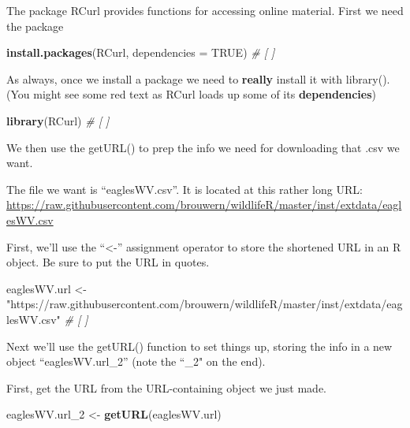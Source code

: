 \documentclass[]{book}
\newenvironment{Shaded}{\begin{snugshade}}{\end{snugshade}}
\newcommand{\KeywordTok}[1]{\textcolor[rgb]{0.13,0.29,0.53}{\textbf{#1}}}
\newcommand{\DataTypeTok}[1]{\textcolor[rgb]{0.13,0.29,0.53}{#1}}
\newcommand{\DecValTok}[1]{\textcolor[rgb]{0.00,0.00,0.81}{#1}}
\newcommand{\StringTok}[1]{\textcolor[rgb]{0.31,0.60,0.02}{#1}}
\newcommand{\CommentTok}[1]{\textcolor[rgb]{0.56,0.35,0.01}{\textit{#1}}}
\newcommand{\OtherTok}[1]{\textcolor[rgb]{0.56,0.35,0.01}{#1}}
\newcommand{\NormalTok}[1]{#1}
\theoremstyle{definition}
\theoremstyle{definition}
\theoremstyle{definition}
\theoremstyle{remark}
\begin{document}
The package RCurl provides functions for accessing online material.
First we need the package

\begin{Shaded}
\begin{Highlighting}[]
\KeywordTok{install.packages}\NormalTok{(RCurl, }\DataTypeTok{dependencies =} \OtherTok{TRUE}\NormalTok{) }\CommentTok{# [ ]}
\end{Highlighting}
\end{Shaded}

As always, once we install a package we need to \textbf{really} install
it with library(). (You might see some red text as RCurl loads up some
of its \textbf{dependencies})

\begin{Shaded}
\begin{Highlighting}[]
\KeywordTok{library}\NormalTok{(RCurl) }\CommentTok{# [ ]}
\end{Highlighting}
\end{Shaded}

We then use the getURL() to prep the info we need for downloading that
.csv we want.

The file we want is ``eaglesWV.csv''. It is located at this rather long
URL:\\
\url{https://raw.githubusercontent.com/brouwern/wildlifeR/master/inst/extdata/eaglesWV.csv}

First, we'll use the ``\textless{}-'' assignment operator to store the
shortened URL in an R object. Be sure to put the URL in quotes.

\begin{Shaded}
\begin{Highlighting}[]
\NormalTok{eaglesWV.url <-}\StringTok{ "https://raw.githubusercontent.com/brouwern/wildlifeR/master/inst/extdata/eaglesWV.csv"} \CommentTok{# [ ]}
\end{Highlighting}
\end{Shaded}

Next we'll use the getURL() function to set things up, storing the info
in a new object ``eaglesWV.url\_2'' (note the ``\_2" on the end).

First, get the URL from the URL-containing object we just made.

\begin{Shaded}
\begin{Highlighting}[]
\NormalTok{eaglesWV.url_}\DecValTok{2}\NormalTok{ <-}\StringTok{ }\KeywordTok{getURL}\NormalTok{(eaglesWV.url)}
\end{Highlighting}
\end{Shaded}
\end{document}
